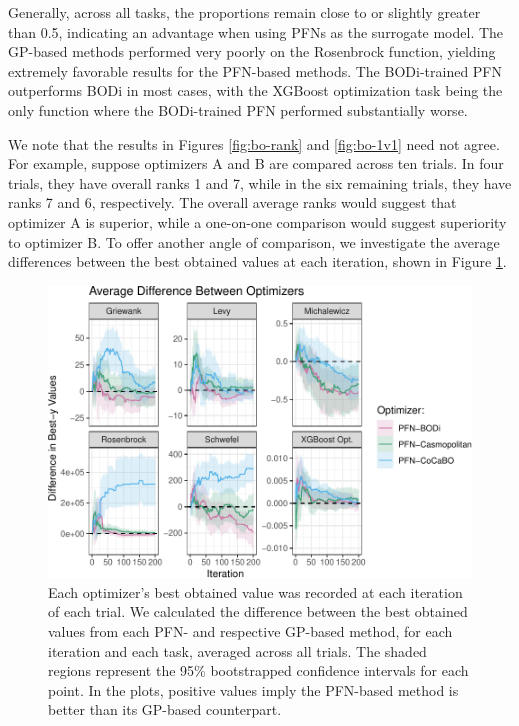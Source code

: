 \documentclass[12pt,twoside]{reedthesis}
\begin{document}
Generally, across all tasks, the proportions remain close to or slightly greater than 0.5, indicating an advantage when using PFNs as the surrogate model. The GP-based methods performed very poorly on the Rosenbrock function, yielding extremely favorable results for the PFN-based methods. The BODi-trained PFN outperforms BODi in most cases, with the XGBoost optimization task being the only function where the BODi-trained PFN performed substantially worse.

We note that the results in Figures \ref{fig:bo-rank} and \ref{fig:bo-1v1} need not agree. For example, suppose optimizers A and B are compared across ten trials. In four trials, they have overall ranks 1 and 7, while in the six remaining trials, they have ranks 7 and 6, respectively. The overall average ranks would suggest that optimizer A is superior, while a one-on-one comparison would suggest superiority to optimizer B. To offer another angle of comparison, we investigate the average differences between the best obtained values at each iteration, shown in Figure \ref{fig:bo-best-y-diffs}.
\begin{figure}
\centering
\includegraphics{thesis_files/figure-latex/bo-best-y-diffs-1.pdf}
\caption{\label{fig:bo-best-y-diffs}Each optimizer's best obtained value was recorded at each iteration of each trial. We calculated the difference between the best obtained values from each PFN- and respective GP-based method, for each iteration and each task, averaged across all trials. The shaded regions represent the 95\% bootstrapped confidence intervals for each point. In the plots, positive values imply the PFN-based method is better than its GP-based counterpart.}
\end{figure}
\end{document}

